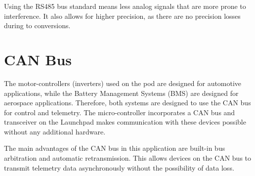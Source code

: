 Using the RS485 bus standard means less analog signals that are more prone to interference. It also allows for higher precision, as there are no precision losses during to conversions.

\section{CAN Bus}

The motor-controllers (inverters) used on the pod are designed for automotive applications, while the Battery Management Systems (BMS) are designed for aerospace applications. Therefore, both systems are designed to use the CAN bus for control and telemetry. The micro-controller incorporates a CAN bus and transceiver on the Launchpad makes communication with these devices possible without any additional hardware.

The main advantages of the CAN bus in this application are built-in bus arbitration and automatic retransmission. This allows devices on the CAN bus to transmit telemetry data asynchronously without the possibility of data loss.
